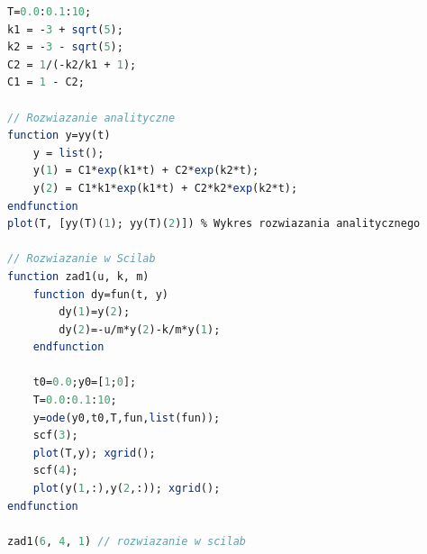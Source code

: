 \documentclass[12pt]{article}
\begin{document}
\begin{lstlisting}[label={code1},language=scilab,caption={Kod porównujący rozwiązania}]
T=0.0:0.1:10;
k1 = -3 + sqrt(5);
k2 = -3 - sqrt(5);
C2 = 1/(-k2/k1 + 1);
C1 = 1 - C2;

// Rozwiazanie analityczne
function y=yy(t)
    y = list();
    y(1) = C1*exp(k1*t) + C2*exp(k2*t);
    y(2) = C1*k1*exp(k1*t) + C2*k2*exp(k2*t);
endfunction
plot(T, [yy(T)(1); yy(T)(2)]) % Wykres rozwiazania analitycznego

// Rozwiazanie w Scilab
function zad1(u, k, m)
    function dy=fun(t, y)
        dy(1)=y(2);
        dy(2)=-u/m*y(2)-k/m*y(1);
    endfunction
    
    t0=0.0;y0=[1;0];
    T=0.0:0.1:10;
    y=ode(y0,t0,T,fun,list(fun));
    scf(3);
    plot(T,y); xgrid();
    scf(4);
    plot(y(1,:),y(2,:)); xgrid();
endfunction

zad1(6, 4, 1) // rozwiazanie w scilab


\end{lstlisting}
\end{document}
